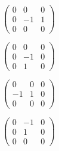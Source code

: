\begin{figure}[H]
  \begin{minipage}[b]{0.5\linewidth}
    \centering

    \begin{equation}
    \begin{pmatrix}
    0 & 0 & 0 \\
    0 & -1 & 1\\
    0 & 0 & 0
    \end{pmatrix}
    \end{equation}

  \end{minipage}
    \hspace{0.5cm}
  \begin{minipage}[b]{0.5\linewidth}

    \begin{equation}
    \begin{pmatrix}
    0 & 0 & 0 \\
    0 & -1 & 0\\
    0 & 1 & 0
    \end{pmatrix}
    \end{equation}
  \end{minipage}
\end{figure}

\begin{figure}[H]
  \begin{minipage}[b]{0.5\linewidth}
    \centering

    \begin{equation}
    \begin{pmatrix}
    0 & 0 & 0 \\
    -1 & 1 & 0\\
    0 & 0 & 0
    \end{pmatrix}
    \end{equation}

  \end{minipage}
    \hspace{0.5cm}
  \begin{minipage}[b]{0.5\linewidth}

    \begin{equation}
    \begin{pmatrix}
    0 & -1 & 0 \\
    0 & 1 & 0\\
    0 & 0 & 0
    \end{pmatrix}
    \end{equation}

  \end{minipage}
\end{figure}
